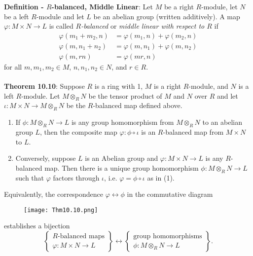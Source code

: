 \documentclass{article}
\begin{document}
\textbf{Definition - $R$-balanced, Middle Linear}: Let $M$ be a right $R$-module, let $N$ be a left $R$-module and let $L$ be an abelian group (written additively). A map $\varphi: M \times N \rightarrow L$ is called \textit{$R$-balanced} or \textit{middle linear with respect to $R$} if \begin{align*}
    \varphi(m_1 + m_2, n) &= \varphi(m_1, n) + \varphi(m_2, n) \\
    \varphi(m, n_1 + n_2) &= \varphi(m, n_1) + \varphi(m, n_2) \\
    \varphi(m, rn) &= \varphi(mr, n)
\end{align*} for all $m, m_1, m_2 \in M$, $n, n_1, n_2 \in N$, and $r \in R$. \\ \\
\textbf{Theorem 10.10}: Suppose $R$ is a ring with 1, $M$ is a right $R$-module, and $N$ is a left $R$-module. Let $M \otimes_R N$ be the tensor product of $M$ and $N$ over $R$ and let $\iota: M \times N \rightarrow M \otimes_R N$ be the $R$-balanced map defined above. \begin{enumerate}
    \item If $\phi: M \otimes_R N \rightarrow L$ is any group homomorphism from $M \otimes_R N$ to an abelian group $L$, then the composite map $\varphi: \phi \circ \iota$ is an $R$-balanced map from $M \times N$ to $L$.
    \item Conversely, suppose $L$ is an Abelian group and $\varphi: M \times N \rightarrow L$ is any $R$-balanced map. Then there is a unique group homomorphism $\phi: M \otimes_R N \rightarrow L$ such that $\varphi$ factors through $\iota$, i.e. $\varphi = \phi \circ \iota$ as in (1).
\end{enumerate} Equivalently,  the correspondence $\varphi \leftrightarrow \phi$ in the commutative diagram \vspace{-2mm} \begin{figure}[H]
\begin{center}
\texttt{[image: Thm10.10.png]}
\end{center}
\end{figure} \vspace{-7mm} \noindent establishes a bijection $$\begin{Bmatrix}
    R\text{-balanced maps} \\
    \varphi: M \times N \rightarrow L
\end{Bmatrix} \leftrightarrow \begin{Bmatrix}
    \text{group homomorphisms} \\
    \phi: M \otimes_R N \rightarrow L
\end{Bmatrix}.$$ \\
\end{document}
